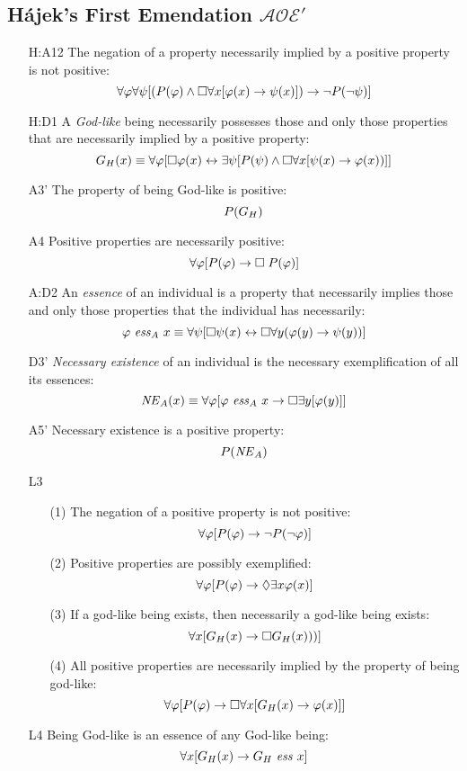 \documentclass{birkjour}
\newcommand{\AOEH}{$\mathcal{AOE}'$}
\theoremstyle{definition}
\theoremstyle{remark}
\numberwithin{equation}{section}
\begin{document}
\begin{appendix}
\section{Hájek's First Emendation \AOEH} \label{apx:Hajek1}

\begin{itemize}
\item[H:A12] The negation of a property necessarily implied by a
  positive property is not positive:
  $$\forall \varphi \forall \psi [(P(\varphi) \wedge \Box \forall x [\varphi(x)
  \rightarrow \psi(x)]) \rightarrow \neg P(\neg \psi)]$$
\item[H:D1] A \emph{God-like} being necessarily possesses those and only those properties that are necessarily implied by a positive property: 
  $$G_H(x) \equiv \forall \varphi [\Box \varphi(x) \leftrightarrow \exists \psi[P(\psi) \wedge \Box \forall x [\psi(x)  \rightarrow \varphi(x))]]$$ 
\item[A3']  The property of being God-like is positive: 
  $$P(G_H)$$
\item[A4]  Positive properties are necessarily positive: 
  $$\forall \varphi [P(\varphi) \rightarrow \Box \; P(\varphi)]$$ 
\item[A:D2] An \emph{essence} of an individual is a property that necessarily implies those and only those properties that the individual has necessarily: $$\varphi \ \mathit{ess}_A \ x \equiv \forall
  \psi [\Box \psi(x) \leftrightarrow \Box \forall y (\varphi(y) \rightarrow \psi(y))]$$ 
\item[D3'] \emph{Necessary existence} of an individual is the necessary exemplification of all its essences: 
  $$\mathit{NE}_A(x) \equiv \forall \varphi [\varphi \ \mathit{ess}_A \ x \rightarrow \Box
  \exists y [\varphi(y)]]$$
\item[A5'] Necessary existence is a positive property: $$P(\mathit{NE}_A)$$ 

\item[L3] 
  \begin{itemize}
  \item[(1)] The negation of a positive property is not positive:
$$\forall \varphi[P(\varphi) \rightarrow \neg P(\neg \varphi)]$$
  \item[(2)] Positive properties are possibly exemplified:
$$\forall \varphi[P(\varphi) \rightarrow \Diamond \exists x \varphi(x)]$$
  \item[(3)] If a god-like being exists, then necessarily a god-like being exists:
$$\forall x[G_H(x) \rightarrow \Box G_H(x)))]$$  
  \item[(4)] All positive properties are necessarily implied by the property of being god-like:
$$\forall \varphi[P(\varphi) \rightarrow \Box \forall x[G_H(x) \rightarrow \varphi(x)]]$$
  \end{itemize}
\item[L4]  Being God-like is an essence of any
  God-like being: $$\forall x [G_H(x) \rightarrow G_H \ \mathit{ess} \ x]$$


\end{itemize}
\end{appendix}
\end{document}
